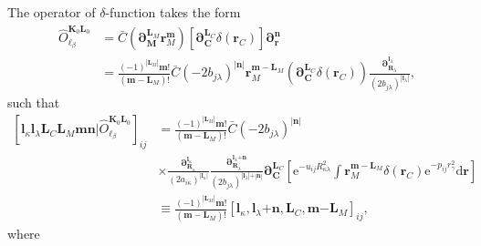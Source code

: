 \documentclass[a4paper,11pt,twoside,openright]{book}
\begin{document}
The operator of $\delta$-function takes the form
\begin{align}
  \hat{O}_{\ell_{\beta}}^{\boldsymbol{K}_{0}\boldsymbol{L}_{0}}%
  &=\bar{C}\left(\boldsymbol{\partial}_{\boldsymbol{M}}^{\boldsymbol{L}_{M}}\boldsymbol{r}_{M}^{\boldsymbol{m}}\right)%
      \left[\boldsymbol{\partial}_{\boldsymbol{C}}^{\boldsymbol{L}_{C}}\delta(\boldsymbol{r}_{C})\right]%
      \boldsymbol{\partial}_{\boldsymbol{r}}^{\boldsymbol{n}}\\
  &=\frac{(-1)^{|\boldsymbol{L}_{M}|}\boldsymbol{m}!}{(\boldsymbol{m}-\boldsymbol{L}_{M})!}%
    \bar{C}(-2b_{j\lambda})^{|\boldsymbol{n}|}%
    \boldsymbol{r}_{M}^{\boldsymbol{m}-\boldsymbol{L}_{M}}%
    \left(\boldsymbol{\partial}_{\boldsymbol{C}}^{\boldsymbol{L}_{C}}\delta(\boldsymbol{r}_{C})\right)%
    \frac{\boldsymbol{\partial}_{\boldsymbol{R}_{\lambda}}^{\boldsymbol{l}_{\lambda}}}%
      {(2b_{j\lambda})^{|\boldsymbol{l}_{\lambda}|}},\nonumber
\end{align}
such that
\begin{align}
  \left[\boldsymbol{l}_{\kappa}\boldsymbol{l}_{\lambda}\boldsymbol{L}_{C}%
    \boldsymbol{L}_{M}\boldsymbol{m}\boldsymbol{n}\Big|%
    \hat{O}_{\ell_{\beta}}^{\boldsymbol{K}_{0}\boldsymbol{L}_{0}}\right]_{ij}
  &=\frac{(-1)^{|\boldsymbol{L}_{M}|}\boldsymbol{m}!}{(\boldsymbol{m}-\boldsymbol{L}_{M})!}%
    \bar{C}(-2b_{j\lambda})^{|\boldsymbol{n}|}\\
  &\times\frac{\boldsymbol{\partial}_{\boldsymbol{R}_{\kappa}}^{\boldsymbol{l}_{\kappa}}}%
      {(2a_{i\kappa})^{|\boldsymbol{l}_{\kappa}|}}%
    \frac{\boldsymbol{\partial}_{\boldsymbol{R}_{\lambda}}^{\boldsymbol{l}_{\lambda}\mathrm{+}\boldsymbol{n}}}%
      {(2b_{j\lambda})^{|\boldsymbol{l}_{\lambda}|\mathrm{+}|\boldsymbol{n}|}}%
    \boldsymbol{\partial}_{\boldsymbol{C}}^{\boldsymbol{L}_{C}}%
    \left[\mathrm{e}^{-u_{ij}R_{\kappa\lambda}^2}\int%
      \boldsymbol{r}_{M}^{\boldsymbol{m}-\boldsymbol{L}_{M}}\delta(\boldsymbol{r}_{C})%
        \mathrm{e}^{-p_{ij}r_{\gamma}^2}\mathrm{d}\boldsymbol{r}\right]\nonumber\\
  &\equiv\frac{(-1)^{|\boldsymbol{L}_{M}|}\boldsymbol{m}!}{(\boldsymbol{m}-\boldsymbol{L}_{M})!}%
    \left[\boldsymbol{l}_{\kappa},\boldsymbol{l}_{\lambda}\mathrm{+}\boldsymbol{n},%
    \boldsymbol{L}_{C},\boldsymbol{m}\mathrm{-}\boldsymbol{L}_{M}\right]_{ij},\nonumber
\end{align}
where
\end{document}
